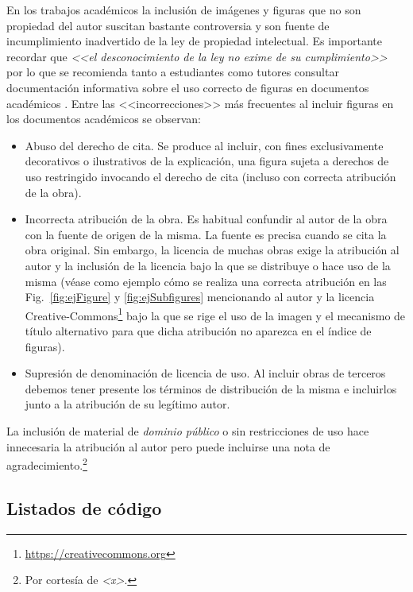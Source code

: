 En los trabajos académicos la inclusión de imágenes y figuras que no son propiedad del autor suscitan bastante controversia y son fuente de incumplimiento inadvertido de la ley de propiedad intelectual. Es importante recordar que \emph{<<el desconocimiento de la ley no exime de su cumplimiento>>} por lo que se recomienda tanto a estudiantes como tutores consultar documentación informativa sobre el uso correcto de figuras en documentos académicos \cite{unican18}. Entre las <<incorrecciones>> más frecuentes al incluir figuras en los documentos académicos se observan:
\begin{itemize}
\item Abuso del derecho de cita. Se produce al incluir, con fines exclusivamente decorativos o ilustrativos de la explicación, una figura sujeta a derechos de uso restringido invocando el derecho de cita (incluso con correcta atribución de la obra).

\item Incorrecta atribución de la obra. Es habitual confundir al autor de la obra con la fuente de origen de la misma. La fuente es precisa cuando se cita la obra original. Sin embargo, la licencia de muchas obras exige la atribución al autor y la inclusión de la licencia bajo la que se distribuye o hace uso de la misma (véase como ejemplo cómo se realiza una correcta atribución en las Fig.~\ref{fig:ejFigure} y \ref{fig:ejSubfigures} mencionando al autor y la licencia Creative-Commons\footnote{\url{https://creativecommons.org}} bajo la que se rige el uso de la imagen y el mecanismo de título alternativo para que dicha atribución no aparezca en el índice de figuras).

\item Supresión de denominación de licencia de uso. Al incluir obras de terceros debemos tener presente los términos de distribución de la misma e incluirlos junto a la atribución de su legítimo autor.
\end{itemize}

La inclusión de material de \emph{dominio público} o sin restricciones de uso hace innecesaria la atribución al autor pero puede incluirse una nota de agradecimiento.\footnote{Por cortesía de \emph{<x>}.}

\subsection{Listados de código}
\label{sec:ejListados}

